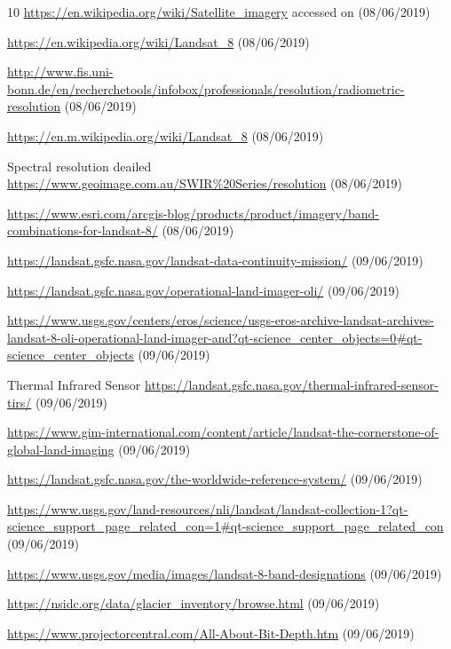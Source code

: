 \documentclass[12pt, a4paper]{report}
\begin{document}
\begin{thebibliography} {10}
		\url{https://en.wikipedia.org/wiki/Satellite_imagery} accessed on (08/06/2019)
		
		\url{https://en.wikipedia.org/wiki/Landsat_8} (08/06/2019)
		
		\url{http://www.fis.uni-bonn.de/en/recherchetools/infobox/professionals/resolution/radiometric-resolution} (08/06/2019)
		
		\url{https://en.m.wikipedia.org/wiki/Landsat_8} (08/06/2019)
		
		 Spectral resolution deailed
		\url{https://www.geoimage.com.au/SWIR%20Series/resolution}
			(08/06/2019)
			
			\url{https://www.esri.com/arcgis-blog/products/product/imagery/band-combinations-for-landsat-8/}
			(08/06/2019)
			
			\url{https://landsat.gsfc.nasa.gov/landsat-data-continuity-mission/} 
			(09/06/2019)
			
			\url{https://landsat.gsfc.nasa.gov/operational-land-imager-oli/}
			(09/06/2019)
			
			\url{https://www.usgs.gov/centers/eros/science/usgs-eros-archive-landsat-archives-landsat-8-oli-operational-land-imager-and?qt-science_center_objects=0#qt-science_center_objects}
			(09/06/2019)
			
			 Thermal Infrared Sensor
			\url{https://landsat.gsfc.nasa.gov/thermal-infrared-sensor-tirs/}
			(09/06/2019)
			
			\url{https://www.gim-international.com/content/article/landsat-the-cornerstone-of-global-land-imaging}
			(09/06/2019)
			
			\url{https://landsat.gsfc.nasa.gov/the-worldwide-reference-system/}
			(09/06/2019)
			
			\url{https://www.usgs.gov/land-resources/nli/landsat/landsat-collection-1?qt-science_support_page_related_con=1#qt-science_support_page_related_con}
			(09/06/2019)
			
			\url{https://www.usgs.gov/media/images/landsat-8-band-designations}
			(09/06/2019)
			
			\url{https://nsidc.org/data/glacier_inventory/browse.html}
			(09/06/2019)
			
			\url{https://www.projectorcentral.com/All-About-Bit-Depth.htm}
			(09/06/2019)
			

\end{thebibliography}
\end{document}
